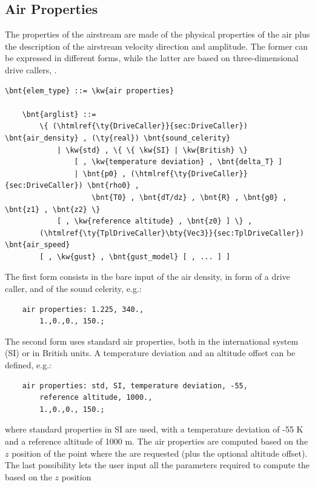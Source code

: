 \subsection{Air Properties}\label{sec:EL:AERO:AIRPROPERTIES}
The properties of the airstream are made of the physical properties
of the air plus the description of the airstream velocity direction
and amplitude.
The former can be expressed in different forms, while the latter
are based on three-dimensional drive callers, .
\begin{Verbatim}[commandchars=\\\{\}]
    \bnt{elem_type} ::= \kw{air properties}

    \bnt{arglist} ::=
        \{ (\htmlref{\ty{DriveCaller}}{sec:DriveCaller}) \bnt{air_density} , (\ty{real}) \bnt{sound_celerity}
            | \kw{std} , \{ \{ \kw{SI} | \kw{British} \}
                [ , \kw{temperature deviation} , \bnt{delta_T} ]
                | \bnt{p0} , (\htmlref{\ty{DriveCaller}}{sec:DriveCaller}) \bnt{rho0} ,
                    \bnt{T0} , \bnt{dT/dz} , \bnt{R} , \bnt{g0} , \bnt{z1} , \bnt{z2} \}
            [ , \kw{reference altitude} , \bnt{z0} ] \} ,
        (\htmlref{\ty{TplDriveCaller}\bty{Vec3}}{sec:TplDriveCaller}) \bnt{air_speed}
        [ , \kw{gust} , \bnt{gust_model} [ , ... ] ]
\end{Verbatim}
The first form consists in the bare input of the air density,
in form of a drive caller, and of the sound celerity, e.g.:
\begin{verbatim}
    air properties: 1.225, 340.,
        1.,0.,0., 150.;
\end{verbatim}
The second form uses standard air properties, both in the
international system (SI) or in British units.
A temperature deviation and an altitude offset can be defined, e.g.:
\begin{verbatim}
    air properties: std, SI, temperature deviation, -55,
        reference altitude, 1000.,
        1.,0.,0., 150.;
\end{verbatim}
where standard properties in SI are used, with a temperature
deviation of -55 K and a reference altitude of 1000 m.
The air properties are computed based on the $z$ position of the
point where the  are requested (plus the optional
altitude offset).
The last possibility lets the user input all the parameters
required to compute the  based on the $z$ position
